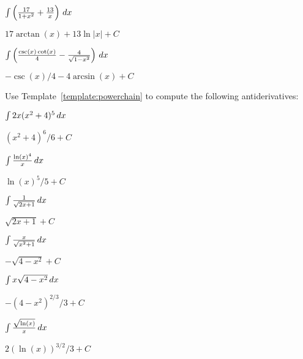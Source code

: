 \begin{exercises}
\begin{multicols}{2}
\begin{exercise}
$\int\left(\frac{17}{1 + x^2} +\frac{13}{x}\right)\, d x$
\begin{answer}
$17\arctan(x) + 13\ln|x| +C$
\end{answer}
\end{exercise}

\begin{exercise}
$\int\left(\frac{\csc(x)\cot(x)}{4} - \frac{4}{\sqrt{1-x^2}}\right)\, d x$
\begin{answer}
$-\csc(x)/4 - 4\arcsin(x) + C$
\end{answer}
\end{exercise}

\end{multicols}



\noindent Use Template~\ref{template:powerchain} to compute the
following antiderivatives:
\begin{multicols}{2}
\begin{exercise}
$\int 2x (x^2+4)^5 \, d x$
\begin{answer}
$(x^2+4)^6/6 + C$
\end{answer}
\end{exercise}

\begin{exercise}
$\int \frac{\ln(x)^4}{x} \, d x$ 
\begin{answer}
$\ln(x)^5/5 +C$
\end{answer}
\end{exercise}


\begin{exercise}
$\int \frac{1}{\sqrt{2x +1}} \, d x$ 
\begin{answer}
$\sqrt{2x+1} + C$
\end{answer}
\end{exercise}

\begin{exercise}
$\int \frac{x}{\sqrt{x^2+1}} \, d x$
\begin{answer}
$-\sqrt{4-x^2} + C$
\end{answer}
\end{exercise}

\begin{exercise}
$\int x\sqrt{4-x^2} \, d x$
\begin{answer}
$-(4-x^2)^{2/3}/3 +C$
\end{answer}
\end{exercise}


\begin{exercise}
$\int \frac{\sqrt{\ln(x)}}{x} \, d x$ 
\begin{answer}
$2(\ln(x))^{3/2}/3 +C$
\end{answer}
\end{exercise}
\end{multicols}


\end{exercises}
